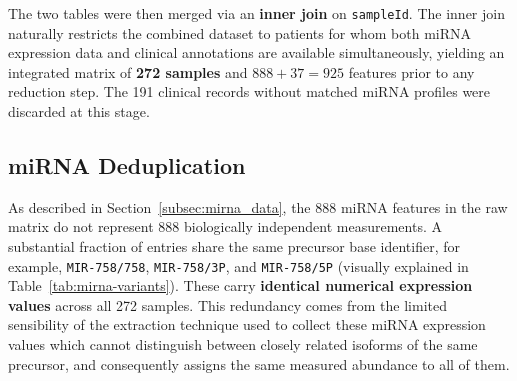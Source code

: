 The two tables were then merged via an \textbf{inner join} on \texttt{sampleId}.
The inner join naturally restricts the combined dataset to patients for whom
both miRNA expression data and clinical annotations are available
simultaneously, yielding an integrated matrix of \textbf{272 samples} and
$888 + 37 = 925$ features prior to any reduction step. The 191 clinical
records without matched miRNA profiles were discarded at this stage.

\subsection{miRNA Deduplication}
\label{subsec:mirna_dedup}

As described in Section~\ref{subsec:mirna_data}, the 888 miRNA features in
the raw matrix do not represent 888 biologically independent measurements.
A substantial fraction of entries share the same precursor base identifier,
for example, \texttt{MIR-758/758}, \texttt{MIR-758/3P}, and
\texttt{MIR-758/5P} (visually explained in Table~\ref{tab:mirna-variants}). These 
carry \textbf{identical numerical expression values} across all 272 samples.
This redundancy comes from the limited sensibility of the extraction technique 
used to collect these miRNA expression values which cannot distinguish between 
closely related isoforms of the same precursor, and consequently assigns the 
same measured abundance to all of them.


